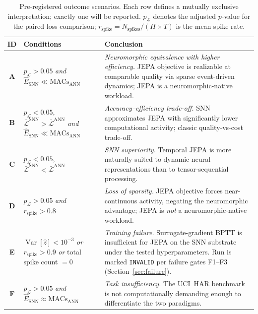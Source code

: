 \documentclass[11pt,a4paper]{article}
\begin{document}
\begin{table}[htbp]
\centering
\caption{Pre-registered outcome scenarios.  Each row defines a
  mutually exclusive interpretation; exactly one will be reported.
  $p_{\mathcal{L}}$ denotes the adjusted $p$-value for the paired
  loss comparison;
  $r_{\text{spike}} = N_{\text{spikes}} / (H \times T)$ is the
  mean spike rate.}
\label{tab:outcomes}
\smallskip
\renewcommand{\arraystretch}{1.15}
\begin{tabular}{@{}cp{3.5cm}p{6.5cm}@{}}
\toprule
\textbf{ID} & \textbf{Conditions} & \textbf{Conclusion} \\
\midrule
\textbf{A}
  & $p_{\mathcal{L}} > 0.05$
    \emph{and} $\hat{E}_{\text{SNN}} \ll
    \text{MACs}_{\text{ANN}}$
  & \emph{Neuromorphic equivalence with higher efficiency.}
    JEPA objective is realizable at comparable quality via sparse
    event-driven dynamics; JEPA is a neuromorphic-native workload. \\[4pt]
\textbf{B}
  & $p_{\mathcal{L}} < 0.05$,
    $\bar{\mathcal{L}}^{\text{SNN}} >
     \bar{\mathcal{L}}^{\text{ANN}}$
    \emph{and}
    $\hat{E}_{\text{SNN}} \ll
    \text{MACs}_{\text{ANN}}$
  & \emph{Accuracy--efficiency trade-off.}
    SNN approximates JEPA with significantly lower computational
    activity; classic quality-vs-cost trade-off. \\[4pt]
\textbf{C}
  & $p_{\mathcal{L}} < 0.05$,
    $\bar{\mathcal{L}}^{\text{SNN}} <
     \bar{\mathcal{L}}^{\text{ANN}}$
  & \emph{SNN superiority.}
    Temporal JEPA is more naturally suited to dynamic neural
    representations than to tensor-sequential processing. \\[4pt]
\textbf{D}
  & $p_{\mathcal{L}} > 0.05$
    \emph{and} $r_{\text{spike}} > 0.8$
  & \emph{Loss of sparsity.}
    JEPA objective forces near-continuous activity, negating
    the neuromorphic advantage; JEPA is \emph{not} a
    neuromorphic-native workload. \\[4pt]
\textbf{E}
  & $\operatorname{Var}[\hat{z}] < 10^{-3}$
    \emph{or} $r_{\text{spike}} > 0.9$
    \emph{or} total spike count $= 0$
  & \emph{Training failure.}
    Surrogate-gradient BPTT is insufficient for JEPA on the SNN
    substrate under the tested hyperparameters.
    Run is marked \texttt{INVALID} per failure gates F1--F3
    (Section~\ref{sec:failure}). \\[4pt]
\textbf{F}
  & $p_{\mathcal{L}} > 0.05$
    \emph{and}
    $\hat{E}_{\text{SNN}} \approx
    \text{MACs}_{\text{ANN}}$
  & \emph{Task insufficiency.}
    The UCI~HAR benchmark is not computationally demanding enough
    to differentiate the two paradigms. \\
\bottomrule
\end{tabular}
\end{table}
\end{document}
